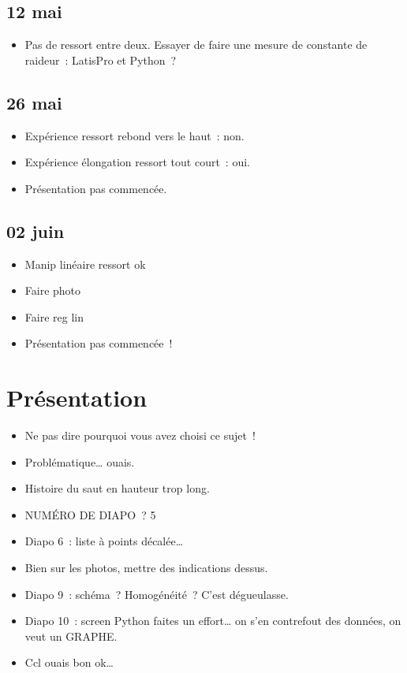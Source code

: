 \documentclass[a4paper, 11pt, final, garamond]{book}
\begin{document}
\subsection{12 mai}
\begin{itemize}
  \item Pas de ressort entre deux. Essayer de faire une mesure de constante de
    raideur~: LatisPro et Python~?
\end{itemize}

\subsection{26 mai}
\begin{itemize}
  \item Expérience ressort rebond vers le haut~: non.
  \item Expérience élongation ressort tout court~: oui.
  \item Présentation pas commencée.
\end{itemize}

\subsection{02 juin}
\begin{itemize}
  \item Manip linéaire ressort ok
  \item Faire photo
  \item Faire reg lin
  \item Présentation pas commencée~!
\end{itemize}

\section{Présentation}
\begin{itemize}
  \item Ne pas dire pourquoi vous avez choisi ce sujet~!
  \item Problématique… ouais.
  \item Histoire du saut en hauteur trop long.
  \item NUMÉRO DE DIAPO~? 5
  \item Diapo 6~: liste à points décalée…
  \item Bien sur les photos, mettre des indications dessus.
  \item Diapo 9~: schéma~? Homogénéité~? C'est dégueulasse.
  \item Diapo 10~: screen Python faites un effort… on s'en contrefout des
    données, on veut un GRAPHE.
  \item Ccl ouais bon ok…
\end{itemize}
\end{document}
